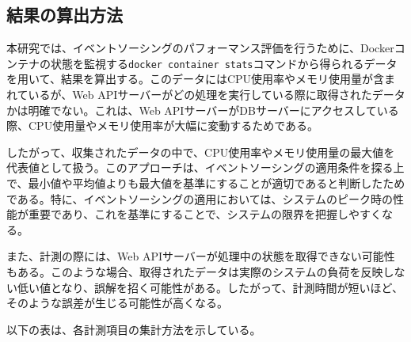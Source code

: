 \documentclass[../../../main]{subfiles}
\begin{document}
    \subsection{結果の算出方法}\label{subsec:method-calculation}

    本研究では、イベントソーシングのパフォーマンス評価を行うために、Dockerコンテナの状態を監視する\texttt{docker container stats}コマンドから得られるデータを用いて、結果を算出する。このデータにはCPU使用率やメモリ使用量が含まれているが、Web APIサーバーがどの処理を実行している際に取得されたデータかは明確でない。これは、Web APIサーバーがDBサーバーにアクセスしている際、CPU使用量やメモリ使用率が大幅に変動するためである。

    したがって、収集されたデータの中で、CPU使用率やメモリ使用量の最大値を代表値として扱う。このアプローチは、イベントソーシングの適用条件を探る上で、最小値や平均値よりも最大値を基準にすることが適切であると判断したためである。特に、イベントソーシングの適用においては、システムのピーク時の性能が重要であり、これを基準にすることで、システムの限界を把握しやすくなる。

    また、計測の際には、Web APIサーバーが処理中の状態を取得できない可能性もある。このような場合、取得されたデータは実際のシステムの負荷を反映しない低い値となり、誤解を招く可能性がある。したがって、計測時間が短いほど、そのような誤差が生じる可能性が高くなる。

    以下の表は、各計測項目の集計方法を示している。

    

    \clearpage
\end{document}
